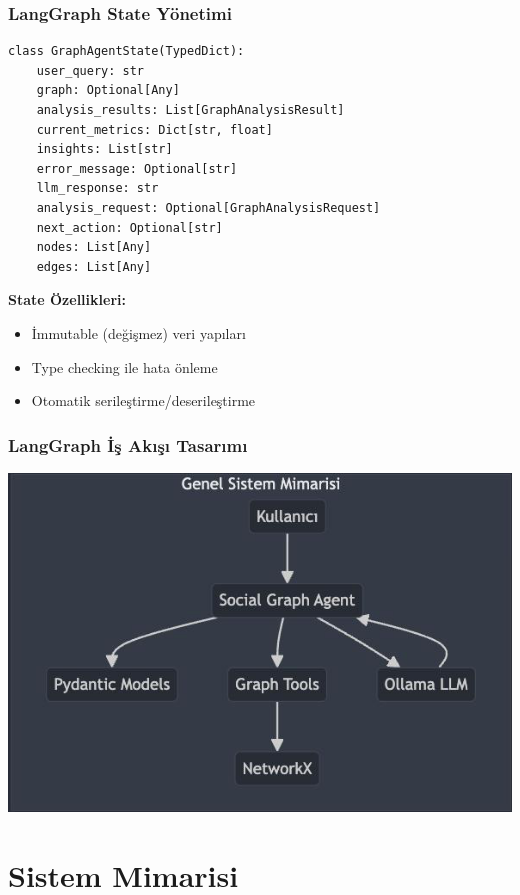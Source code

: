 \documentclass[aspectratio=169]{beamer}
\begin{document}
\begin{frame}[fragile]
\frametitle{LangGraph State Yönetimi}
\begin{lstlisting}[caption=GraphAgentState Veri Yapısı]
class GraphAgentState(TypedDict):
    user_query: str
    graph: Optional[Any]
    analysis_results: List[GraphAnalysisResult]
    current_metrics: Dict[str, float]
    insights: List[str]
    error_message: Optional[str]
    llm_response: str
    analysis_request: Optional[GraphAnalysisRequest]
    next_action: Optional[str]
    nodes: List[Any]
    edges: List[Any]
\end{lstlisting}

\textbf{State Özellikleri:}
\begin{itemize}
    \item İmmutable (değişmez) veri yapıları
    \item Type checking ile hata önleme
    \item Otomatik serileştirme/deserileştirme
\end{itemize}
\end{frame}

\begin{frame}
\frametitle{LangGraph İş Akışı Tasarımı}
\begin{center}
    \includegraphics[width=\textwidth]{workflow.png}
\end{center}
\end{frame}

\section{Sistem Mimarisi}
\end{document}
